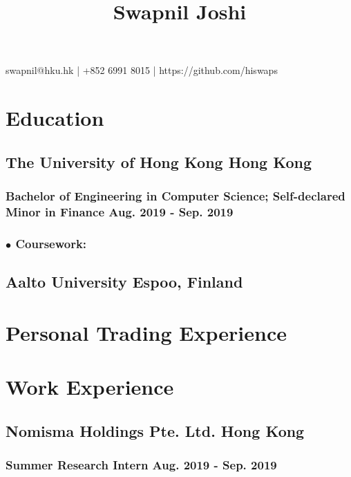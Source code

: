 \documentclass{article}
\makeatletter
\renewcommand{\maketitle}{
\begin{center}
{\huge\bfseries
\thetitle}

\vspace*{0.35cm}

swapnil@hku.hk | +852 6991 8015 | https://github.com/hiswaps

\end{center}
}
\makeatother
\begin{document}
\title{Swapnil Joshi}
\maketitle


\section{Education}
\subsection{The University of Hong Kong \hspace{4.12in} Hong Kong}
\subsubsection{Bachelor of Engineering in Computer Science; Self-declared Minor in Finance \hspace{1.27in} Aug. 2019 - Sep. 2019}

\subsubsection{$\bullet$ \bfseries Coursework:} 

\subsection{Aalto University \hspace{4.8in} Espoo, Finland}


\section{Personal Trading Experience}


\section{Work Experience}

\subsection{Nomisma Holdings Pte. Ltd. \hspace{4.1in} Hong Kong}
\subsubsection{Summer Research Intern \hspace{4.5in} Aug. 2019 - Sep. 2019}
\end{document}
